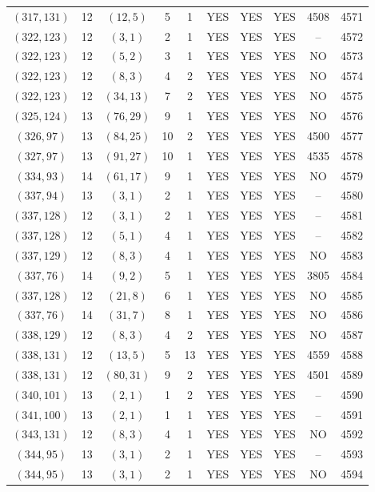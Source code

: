\begin{longtable}{|c|c|c|c|c|c|c|c|c|c|}
$(317, 131)$ & 12 & $(12, 5)$ & 5 & 1 & YES & YES & YES & 4508 & 4571\\
$(322, 123)$ & 12 & $(3, 1)$ & 2 & 1 & YES & YES & YES & -- & 4572\\
$(322, 123)$ & 12 & $(5, 2)$ & 3 & 1 & YES & YES & YES & NO & 4573\\
$(322, 123)$ & 12 & $(8, 3)$ & 4 & 2 & YES & YES & YES & NO & 4574\\
$(322, 123)$ & 12 & $(34, 13)$ & 7 & 2 & YES & YES & YES & NO & 4575\\
$(325, 124)$ & 13 & $(76, 29)$ & 9 & 1 & YES & YES & YES & NO & 4576\\
$(326, 97)$ & 13 & $(84, 25)$ & 10 & 2 & YES & YES & YES & 4500 & 4577\\
$(327, 97)$ & 13 & $(91, 27)$ & 10 & 1 & YES & YES & YES & 4535 & 4578\\
$(334, 93)$ & 14 & $(61, 17)$ & 9 & 1 & YES & YES & YES & NO & 4579\\
$(337, 94)$ & 13 & $(3, 1)$ & 2 & 1 & YES & YES & YES & -- & 4580\\
$(337, 128)$ & 12 & $(3, 1)$ & 2 & 1 & YES & YES & YES & -- & 4581\\
$(337, 128)$ & 12 & $(5, 1)$ & 4 & 1 & YES & YES & YES & -- & 4582\\
$(337, 129)$ & 12 & $(8, 3)$ & 4 & 1 & YES & YES & YES & NO & 4583\\
$(337, 76)$ & 14 & $(9, 2)$ & 5 & 1 & YES & YES & YES & 3805 & 4584\\
$(337, 128)$ & 12 & $(21, 8)$ & 6 & 1 & YES & YES & YES & NO & 4585\\
$(337, 76)$ & 14 & $(31, 7)$ & 8 & 1 & YES & YES & YES & NO & 4586\\
$(338, 129)$ & 12 & $(8, 3)$ & 4 & 2 & YES & YES & YES & NO & 4587\\
$(338, 131)$ & 12 & $(13, 5)$ & 5 & 13 & YES & YES & YES & 4559 & 4588\\
$(338, 131)$ & 12 & $(80, 31)$ & 9 & 2 & YES & YES & YES & 4501 & 4589\\
$(340, 101)$ & 13 & $(2, 1)$ & 1 & 2 & YES & YES & YES & -- & 4590\\
$(341, 100)$ & 13 & $(2, 1)$ & 1 & 1 & YES & YES & YES & -- & 4591\\
$(343, 131)$ & 12 & $(8, 3)$ & 4 & 1 & YES & YES & YES & NO & 4592\\
$(344, 95)$ & 13 & $(3, 1)$ & 2 & 1 & YES & YES & YES & -- & 4593\\
$(344, 95)$ & 13 & $(3, 1)$ & 2 & 1 & YES & YES & YES & NO & 4594\\

\end{longtable}
